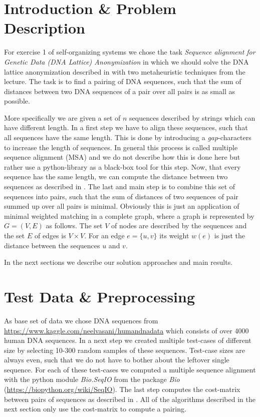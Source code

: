 \documentclass[12pt]{article}
\begin{document}
\maketitle

\section{Introduction \& Problem Description}
For exercise 1 of self-organizing systems we chose the task \textit{Sequence alignment for Genetic Data (DNA Lattice) Anonymization} in which we should solve the DNA lattice anonymization described in \cite{mainpaper} with two metaheuristic techniques from the lecture.
The task is to find a pairing of DNA sequences, such that the sum of distances between two DNA sequences of a pair over all pairs is as small as possible.

More specifically we are given a set of $n$ sequences described by strings which can have different length.
In a first step we have to align these sequences, such that all sequences have the same length.
This is done by introducing a \textit{gap}-characters to increase the length of sequences.
In general this process is called multiple sequence alignment (MSA) and we do not describe how this is done here but rather use a python-library as a black-box tool for this step.
Now, that every sequence has the same length, we can compute the distance between two sequences as described in \cite{mainpaper}.
The last and main step is to combine this set of sequences into pairs, such that the sum of distances of two sequences of pair summed up over all pairs is minimal.
Obviously this is just an application of minimal weighted matching in a complete graph, where a graph is represented by $G=(V,E)$ as follows.
The set $V$ of nodes are described by the sequences and the set $E$ of edges is $V\times V$.
For an edge $e=\{u,v\}$ its weight $w(e)$ is just the distance between the sequences $u$ and $v$.

In the next sections we describe our solution approaches and main results.

\section{Test Data \& Preprocessing}
As base set of data we chose DNA sequences from \url{https://www.kaggle.com/neelvasani/humandnadata} which consists of over 4000 human DNA sequences.
In a next step we created multiple test-cases of different size by selecting 10-300 random samples of these sequences.
Test-case sizes are always even, such that we do not have to bother about the leftover single sequence.
For each of these test-cases we computed a multiple sequence alignment with the python module \textit{Bio.SeqIO} from the package \textit{Bio} (\url{https://biopython.org/wiki/SeqIO}).
The last step computes the cost-matrix between pairs of sequences as described in \cite{mainpaper}.
All of the algorithms described in the next section only use the cost-matrix to compute a pairing.
\end{document}
